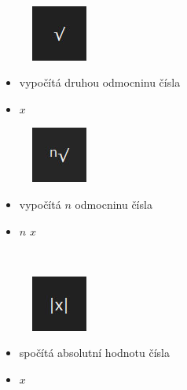 \documentclass[a4paper, 12pt]{article}
\begin{document}
\\%
\begin{minipage}{0.07\textwidth}
\begin{figure}[H]
\includegraphics[scale=0.7]{v.jpg}
\end{figure}
\end{minipage}
\begin{minipage}{0.45\textwidth}
\begin{itemize}
\item vypočítá druhou odmocninu čísla
\item \keys{$\sqrt{\phantom{x}}$} $x$ \keys{=}
\end{itemize}
\end{minipage}
\begin{minipage}{0.07\textwidth}
\begin{figure}[H]
\includegraphics[scale=0.7]{nv.jpg}
\end{figure}
\end{minipage}
\begin{minipage}{0.45\textwidth}
\begin{itemize}
\item vypočítá $n$ odmocninu čísla
\item $n$ \keys{$\sqrt[n]{\phantom{x}}$} $x$ \keys{=}
\end{itemize}
\end{minipage}
\\%
\begin{minipage}{0.07\textwidth}
\begin{figure}[H]
\includegraphics[scale=0.7]{abs.jpg}
\end{figure}
\end{minipage}
\begin{minipage}{0.45\textwidth}
\begin{itemize}
\item spočítá absolutní hodnotu čísla
\item $x$ 
\end{itemize}
\end{minipage}
\end{document}
